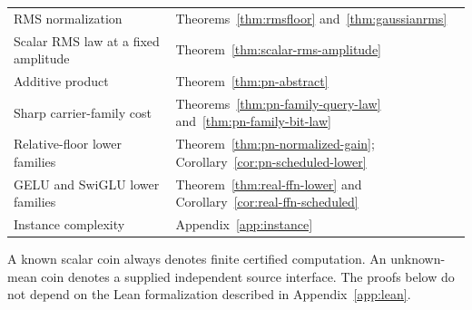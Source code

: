 \begin{center}
\begin{tabularx}{\textwidth}{@{}p{}Y@{}}
RMS normalization & Theorems~\ref{thm:rmsfloor} and~\ref{thm:gaussianrms}\\
Scalar RMS law at a fixed amplitude & Theorem~\ref{thm:scalar-rms-amplitude}\\
Additive product & Theorem~\ref{thm:pn-abstract}\\
Sharp carrier-family cost & Theorems~\ref{thm:pn-family-query-law} and~\ref{thm:pn-family-bit-law}\\
Relative-floor lower families & Theorem~\ref{thm:pn-normalized-gain}; Corollary~\ref{cor:pn-scheduled-lower}\\
GELU and SwiGLU lower families & Theorem~\ref{thm:real-ffn-lower} and Corollary~\ref{cor:real-ffn-scheduled}\\
Instance complexity & Appendix~\ref{app:instance}\\
\bottomrule
\end{tabularx}
\end{center}

A known scalar coin always denotes finite certified computation.
An unknown-mean coin denotes a supplied independent source interface.
The proofs below do not depend on the Lean formalization described
in Appendix~\ref{app:lean}.
